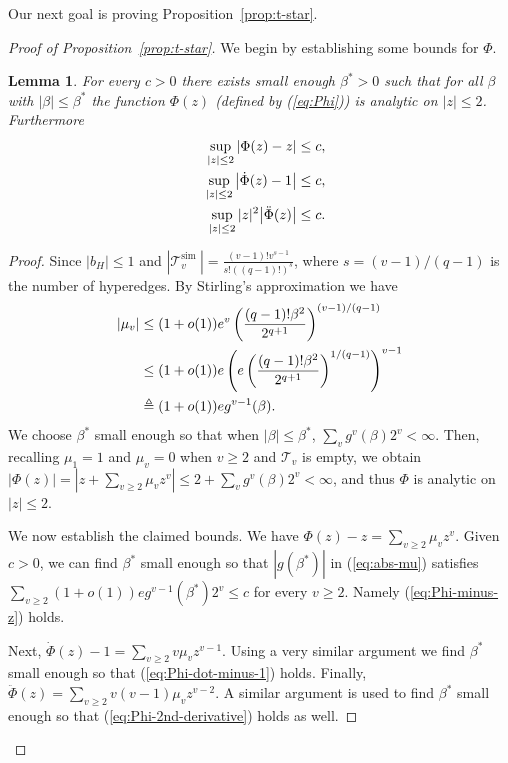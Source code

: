 \documentclass[12pt]{article}
\newtheorem{lemma}[theorem]{Lemma}
\newcommand{\lr}[1]{\left(#1\right)}
\newcommand{\cT}{\mathcal{T}}
\begin{document}
Our next goal is proving Proposition~\ref{prop:t-star}.



\begin{proof}[Proof of Proposition~\ref{prop:t-star}]
We begin by establishing some bounds for $\Phi$.
\begin{lemma}\label{lem:treebounds-0}
For every $c>0$  there exists small enough $\beta^*>0$ such that for all $\beta$ with $|\beta|\le \beta^*$ 
the function $\Phi(z)$ (defined by (\ref{eq:Phi}))  is analytic on $|z| \leq 2$. Furthermore
    \begin{align}
    	\sup_{|z| \leq 2} \abs{\Phi(z) - z} \leq c, \label{eq:Phi-minus-z}\\
	 \sup_{|z| \leq 2} \abs{\dot \Phi(z) - 1} \leq c, \label{eq:Phi-dot-minus-1}\\
	 \quad \sup_{|z| \leq 2} |z|^2 \abs{\ddot\Phi(z)} \leq c. \label{eq:Phi-2nd-derivative}
    \end{align}
\end{lemma}
\begin{proof}
Since $|b_H|\le 1$ and $\left|\mathcal{T}_v^{\text {sim }}\right|=\frac{(v-1)!v^{s-1}}{s!((q-1)!)^s}$, where $s=(v-1)/(q-1)$ is the number of hyperedges.
By Stirling's approximation we have 
\begin{align}
|\mu_v| &\le (1+o(1))e^v\lr{\frac{(q-1)! \beta^2}{2^{q+1}}}^{(v-1)/(q-1)} \notag \\
&\le 
(1+o(1)) e\left(e\lr{\frac{(q-1)! \beta^2}{2^{q+1}}}^{1/(q-1)}\right)^{v-1} \notag \\
&\triangleq 
(1+o(1))eg^{v-1}(\beta).
\label{eq:abs-mu}
\end{align}
We choose $\beta^*$ small enough so that when $|\beta |\le \beta^*$, $\sum_v g^v(\beta)2^v<\infty$. Then, recalling $\mu_1=1$
and $\mu_v=0$ when $v\ge 2$ and $\cT_v$ is empty, we obtain
$|\Phi(z)|=|z+\sum_{v\ge 2} \mu_v z^v|\le 2+\sum_v g^v(\beta)2^v<\infty$, and thus $\Phi$ is analytic on $|z|\le 2$.

We now establish the claimed bounds. We have $\Phi(z)-z=\sum_{v\ge 2}\mu_v z^v$. 
Given $c>0$,  we can find $\beta^*$ small enough so that $|g(\beta^*)|$ in (\ref{eq:abs-mu}) satisfies $\sum_{v\ge 2}  (1+o(1))eg^{v-1}(\beta^*)2^v\le c$ for every $v\ge 2$.
Namely (\ref{eq:Phi-minus-z}) holds.
 
Next, $\dot \Phi(z)-1=\sum_{v\ge 2} v\mu_v z^{v-1}$. Using a very similar argument we find $\beta^*$ small enough so that (\ref{eq:Phi-dot-minus-1}) holds.
Finally, $\ddot \Phi(z)=\sum_{v\ge 2} v(v-1)\mu_v z^{v-2}$. A similar argument is used to find $\beta^*$ small enough so that (\ref{eq:Phi-2nd-derivative}) holds as well. 
\end{proof}


\end{proof}
\end{document}

